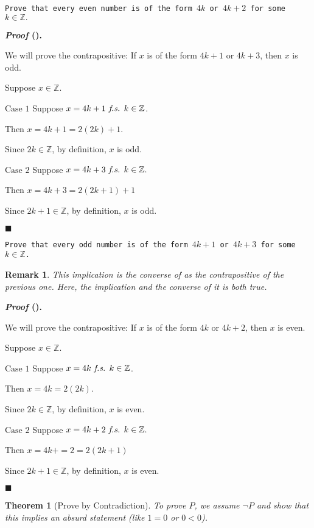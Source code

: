 \documentclass[12pt,a4paper]{article}
\newtheorem{thm}{Theorem}[subsection]
\newcounter{nprf}[subsection]
\newtheorem*{rmk}{\indent Remark}
\newenvironment*{prf}{\par\indent\textbf{\textit{Proof} (\stepcounter{nprf}\thenprf). }\par}{\par\hfill $\blacksquare$\par}
\def\Z{{\mathbb{Z}}}
\def\fs{\emph{ f.s. }}
\begin{document}
\begin{framed}
\noindent\texttt{Prove that every even number is of the form $4k$ or $4k+2$ for some $k\in\Z.$}
\begin{prf}
	We will prove the contrapositive: If $x$ is of the form $4k+1$ or $4k+3$, then $x$ is odd. \par Suppose $x\in\Z$.\par $\boxed{\text{Case }1}$ Suppose $x=4k+1\fs k\in\Z$. \par\hspace{5mm}Then $x=4k+1=2(2k)+1$.\par\hspace{5mm}Since $2k\in\Z$, by definition, $x$ is odd. \par $\boxed{\text{Case }2}$ Suppose $x=4k+3\fs k\in\Z.$\par\hspace{5mm}Then $x=4k+3=2(2k+1)+1$\par\hspace{5mm}Since $2k+1\in\Z$, by definition, $x$ is odd. 
\end{prf}
\end{framed}
\begin{framed}
\noindent\texttt{Prove that every odd number is of the form $4k+1$ or $4k+3$ for some $k\in\Z$.}
\begin{rmk}	This implication is the converse of  as the contrapositive of the previous one. Here, the implication and the converse of it is both true.\end{rmk}
\begin{prf}
	We will prove the contrapositive: If $x$ is of the form $4k$ or $4k+2$, then $x$ is even.\par Suppose $x\in\Z.$ \par $\boxed{\text{Case }1}$ Suppose $x=4k\fs k\in\Z$. \par\hspace{5mm}Then $x=4k=2(2k)$.\par\hspace{5mm}Since $2k\in\Z$, by definition, $x$ is even. \par $\boxed{\text{Case }2}$ Suppose $x=4k+2\fs k\in\Z.$\par\hspace{5mm}Then $x=4k+=2=2(2k+1)$\par\hspace{5mm}Since $2k+1\in\Z$, by definition, $x$ is even. 
\end{prf}
\end{framed}
\begin{thm}[Prove by Contradiction]
	To prove $P$, we assume $\neg P$ and show that this implies an absurd statement (like $1=0$ or $0<0$).
\end{thm}
\end{document}
